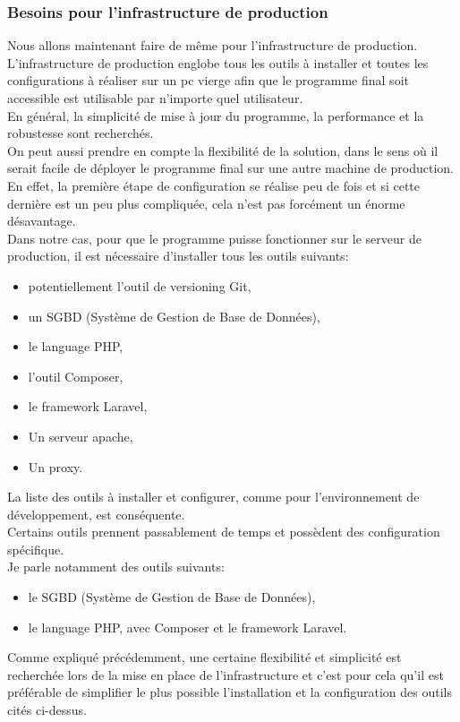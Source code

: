 \documentclass[
    iai, %
    il, %
]{heig-tb}
\begin{document}
\subsubsection{Besoins pour l'infrastructure de production}
Nous allons maintenant faire de même pour l'infrastructure de production.\\
L'infrastructure de production englobe tous les outils à installer et toutes les configurations à réaliser sur un pc vierge afin que le programme final soit accessible est utilisable par n'importe quel utilisateur.\\
En général, la simplicité de mise à jour du programme, la performance et la robustesse sont recherchés.\\
On peut aussi prendre en compte la flexibilité de la solution, dans le sens où il serait facile de déployer le programme final sur une autre machine de production.\\
En effet, la première étape de configuration se réalise peu de fois et si cette dernière est un peu plus compliquée, cela n'est pas forcément un énorme désavantage.\\
Dans notre cas, pour que le programme puisse fonctionner sur le serveur de production, il est nécessaire d'installer tous les outils suivants:
\begin{itemize}
    \item potentiellement l'outil de versioning Git,
    \item un SGBD (Système de Gestion de Base de Données),
    \item le language PHP,
    \item l'outil Composer,
    \item le framework Laravel,
    \item Un serveur \Gls{apache},
    \item Un \Gls{proxy}.
\end{itemize}
La liste des outils à installer et configurer, comme pour l'environnement de développement, est conséquente.\\
Certains outils prennent passablement de temps et possèdent des configuration spécifique.\\
Je parle notamment des outils suivants:
\begin{itemize}
    \item le SGBD (Système de Gestion de Base de Données),
    \item le language PHP, avec Composer et le framework Laravel.
\end{itemize}
Comme expliqué précédemment, une certaine flexibilité et simplicité est recherchée lors de la mise en place de l'infrastructure et c'est pour cela qu'il est préférable de simplifier le plus possible l'installation et la configuration des outils cités ci-dessus.
\end{document}
